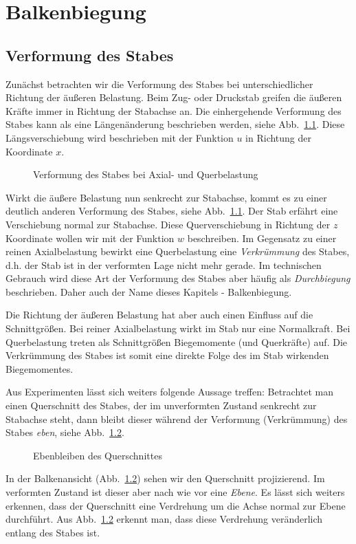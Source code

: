 
\chapter[Balkenbiegung]{Balkenbiegung}

\section{Verformung des Stabes}

Zunächst betrachten wir die Verformung des Stabes bei unterschiedlicher Richtung der äußeren Belastung.
Beim Zug- oder Druckstab greifen die äußeren Kräfte immer in Richtung der Stabachse an.
Die einhergehende Verformung des Stabes kann als eine Längenänderung beschrieben werden, siehe Abb.~\ref{fig:2-1}.
Diese Längsverschiebung wird beschrieben mit der Funktion $u$ in Richtung der Koordinate $x$.  
%
\begin{figure}[h!]
	\centering
	
	\caption{Verformung des Stabes bei Axial- und Querbelastung}
	\label{fig:2-1}
\end{figure}
%
Wirkt die äußere Belastung nun senkrecht zur Stabachse, kommt es zu einer deutlich anderen Verformung des Stabes, siehe Abb.~\ref{fig:2-1}.
Der Stab erfährt eine Verschiebung normal zur Stabachse.
Diese Querverschiebung in Richtung der $z$ Koordinate wollen wir mit der Funktion $w$ beschreiben.
Im Gegensatz zu einer reinen Axialbelastung bewirkt eine Querbelastung eine \emph{Verkrümmung} des Stabes, d.h. der Stab ist in der verformten Lage nicht mehr gerade.
Im technischen Gebrauch wird diese Art der Verformung des Stabes aber häufig als \emph{Durchbiegung} beschrieben.
Daher auch der Name dieses Kapitels - Balkenbiegung.

Die Richtung der äußeren Belastung hat aber auch einen Einfluss auf die Schnittgrößen.
Bei reiner Axialbelastung wirkt im Stab nur eine Normalkraft.
Bei Querbelastung treten als Schnittgrößen Biegemomente (und Querkräfte) auf.
Die Verkrümmung des Stabes ist somit eine direkte Folge des im Stab wirkenden Biegemomentes.

Aus Experimenten lässt sich weiters folgende Aussage treffen: Betrachtet man einen Querschnitt des Stabes, der im unverformten Zustand senkrecht zur Stabachse steht, dann bleibt dieser während der Verformung (Verkrümmung) des Stabes \emph{eben}, siehe Abb.~\ref{fig:2-2}.
%
\begin{figure}[h!]
	\centering
	
	\caption{Ebenbleiben des Querschnittes}
	\label{fig:2-2}
\end{figure}
%
In der Balkenansicht (Abb.~\ref{fig:2-2}) sehen wir den Querschnitt projizierend.
Im verformten Zustand ist dieser aber nach wie vor eine \emph{Ebene}.
Es lässt sich weiters erkennen, dass der Querschnitt eine Verdrehung um die Achse normal zur Ebene durchführt.
Aus Abb.~\ref{fig:2-2} erkennt man, dass diese Verdrehung veränderlich entlang des Stabes ist.

